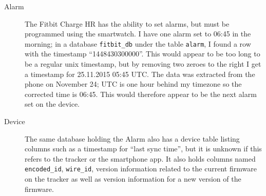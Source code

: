 \documentclass[a4paper,11pt,dvips]{article}
\begin{document}
\begin{description}
\item [Alarm] The Fitbit Charge HR has the ability to set alarms, but must be programmed using the smartwatch. I have one alarm set to 06:45 in the morning; in a database \texttt{fitbit\_db} under the table \texttt{alarm}, I found a row with the timestamp “1448430300000”. This would appear to be too long to be a regular unix timestamp, but by removing two zeroes to the right I get a timestamp for 25.11.2015 05:45 UTC. The data was extracted from the phone on November 24; UTC is one hour behind my timezone so the corrected time is 06:45. This would therefore appear to be the next alarm set on the device.
\item [Device] The same database holding the Alarm also has a device table listing columns such as a timestamp for “last sync time”, but it is unknown if this refers to the tracker or the smartphone app. It also holds columns named \texttt{encoded\_id}, \texttt{wire\_id}, version information related to the current firmware on the tracker as well as version information for a new version of the firmware.


\end{description}
\end{document}
